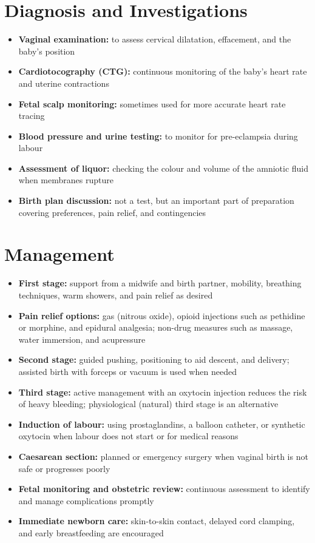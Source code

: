 \section*{Diagnosis and Investigations}
\begin{itemize}
    \item \textbf{Vaginal examination:} to assess cervical dilatation, effacement, and the baby's position
    \item \textbf{Cardiotocography (CTG):} continuous monitoring of the baby's heart rate and uterine contractions
    \item \textbf{Fetal scalp monitoring:} sometimes used for more accurate heart rate tracing
    \item \textbf{Blood pressure and urine testing:} to monitor for pre-eclampsia during labour
    \item \textbf{Assessment of liquor:} checking the colour and volume of the amniotic fluid when membranes rupture
    \item \textbf{Birth plan discussion:} not a test, but an important part of preparation covering preferences, pain relief, and contingencies
\end{itemize}

\section*{Management}
\begin{itemize}
    \item \textbf{First stage:} support from a midwife and birth partner, mobility, breathing techniques, warm showers, and pain relief as desired
    \item \textbf{Pain relief options:} gas (nitrous oxide), opioid injections such as pethidine or morphine, and epidural analgesia; non-drug measures such as massage, water immersion, and acupressure
    \item \textbf{Second stage:} guided pushing, positioning to aid descent, and delivery; assisted birth with forceps or vacuum is used when needed
    \item \textbf{Third stage:} active management with an oxytocin injection reduces the risk of heavy bleeding; physiological (natural) third stage is an alternative
    \item \textbf{Induction of labour:} using prostaglandins, a balloon catheter, or synthetic oxytocin when labour does not start or for medical reasons
    \item \textbf{Caesarean section:} planned or emergency surgery when vaginal birth is not safe or progresses poorly
    \item \textbf{Fetal monitoring and obstetric review:} continuous assessment to identify and manage complications promptly
    \item \textbf{Immediate newborn care:} skin-to-skin contact, delayed cord clamping, and early breastfeeding are encouraged
\end{itemize}


